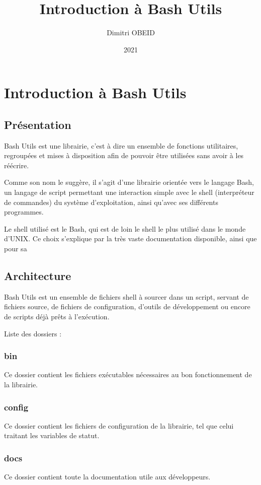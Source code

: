 \documentclass[a4paper,10pt]{article}
\title{Introduction à Bash Utils}
\author{Dimitri OBEID}
\date{2021}
\begin{document}
\maketitle
\newpage

\tableofcontents
\newpage

\section{Introduction à Bash Utils}
\subsection{Présentation}
Bash Utils est une librairie, c'est à dire un ensemble de fonctions utilitaires, regroupées et mises à disposition afin de pouvoir être utilisées sans avoir à les réécrire.

Comme son nom le suggère, il s'agit d'une librairie orientée vers le langage Bash, un langage de script permettant une interaction simple avec le shell (interpréteur de commandes) du système d'exploitation, ainsi qu'avec ses différents programmes.

Le shell utilisé est le Bash, qui est de loin le shell le plus utilisé dans le monde d'UNIX. Ce choix s'explique par la très vaste documentation disponible, ainsi que pour sa

\subsection{Architecture}
Bash Utils est un ensemble de fichiers shell à sourcer dans un script, servant de fichiers source, de fichiers de configuration, d'outils de développement ou encore de scripts déjà prêts à l'exécution.

Liste des dossiers :
\subsubsection{bin}
Ce dossier contient les fichiers exécutables nécessaires au bon fonctionnement de la librairie.

\subsubsection{config}
Ce dossier contient les fichiers de configuration de la librairie, tel que celui traitant les variables de statut.

\subsubsection{docs}
Ce dossier contient toute la documentation utile aux développeurs.
\end{document}
